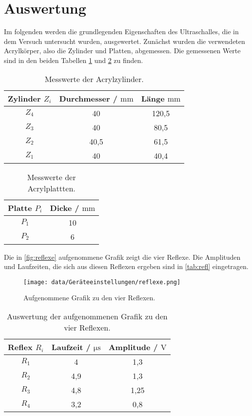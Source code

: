\section{Auswertung}
\label{sec:Auswertung}

Im folgenden werden die grundlegenden Eigenschaften des Ultraschalles, die in dem Versuch untersucht wurden, ausgewertet. \newline
Zunächst wurden die verwendeten Acrylkörper, also die Zylinder und Platten, abgemessen. Die gemessenen Werte sind in den beiden Tabellen 
\ref{tab:koerper1} und \ref{tab:koerper2} zu finden.

\begin{table}
  \centering
  \caption{Messwerte der Acrylzylinder.}
  \label{tab:koerper1}
  \begin{tabular}{c c c}
    \toprule
    Zylinder $Z_i$ & Durchmesser / $\si{\milli\meter}$ &  Länge $\si{\milli\meter}$\\
    \midrule
    $Z_4$ & 40 & 120,5 \\
    $Z_3$ & 40 & 80,5 \\
    $Z_2$ & 40,5 & 61,5 \\
    $Z_1$ & 40 & 40,4 \\
    \bottomrule
  \end{tabular}
\end{table}

\begin{table}
  \centering
  \caption{Messwerte der Acrylplattten.}
  \label{tab:koerper2}
  \begin{tabular}{c c}
    \toprule
    Platte $P_i$ & Dicke / $\si{\milli\meter}$ \\
    \midrule
    $P_1$ & 10 \\
    $P_2$ & 6 \\
    \bottomrule
  \end{tabular}
\end{table}

Die in \autoref{fig:reflexe} aufgenommene Grafik zeigt die vier Reflexe. Die Amplituden und Laufzeiten, die sich aus diesen Reflexen ergeben sind in \autoref{tab:refl}
eingetragen.

\begin{figure}[H]
  \centering
  \texttt{[image: data/Geräteeinstellungen/reflexe.png]}
  \caption{Aufgenommene Grafik zu den vier Reflexen.}
  \label{fig:reflexe}
\end{figure}

\begin{table}
  \centering
  \caption{Auswertung der aufgenommenen Grafik zu den vier Reflexen.}
  \label{tab:refl}
  \begin{tabular}{c c c}
    \toprule
    Reflex $R_i$ & Laufzeit / $\si{\micro\second}$ & Amplitude / $\si{\volt}$ \\
    \midrule
    $R_1$ & 4 & 1,3 \\
    $R_2$ & 4,9 & 1,3 \\
    $R_3$ & 4,8 & 1,25 \\
    $R_4$ & 3,2 & 0,8 \\
    \bottomrule
  \end{tabular}
\end{table}
